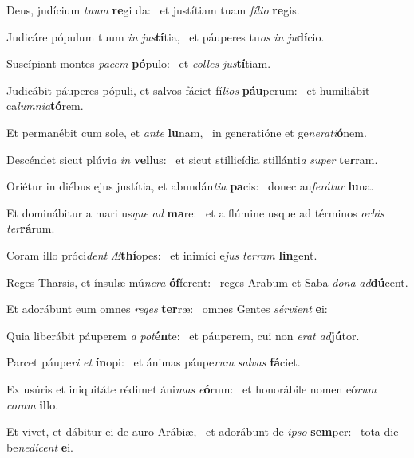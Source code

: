 \item Deus, judícium \textit{tuum} \textbf{re}gi da:~\psstar{} et justítiam tuam \textit{fílio} \textbf{re}gis.
\item Judicáre pópulum tuum \textit{in} \textit{jus}\textbf{tí}tia,~\psstar{} et páuperes tu\textit{os} \textit{in} \textit{ju}\textbf{dí}cio.
\item Suscípiant montes \textit{pacem} \textbf{pó}pulo:~\psstar{} et \textit{colles} \textit{jus}\textbf{tí}tiam.
\item Judicábit páuperes pópuli, et salvos fáciet fí\textit{lios} \textbf{páu}perum:~\psstar{} et humiliábit ca\textit{lumnia}\textbf{tó}rem.
\item Et permanébit cum sole, et \textit{ante} \textbf{lu}nam,~\psstar{} in generatióne et ge\textit{nerati}\textbf{ó}nem.
\item Descéndet sicut plúvi\textit{a} \textit{in} \textbf{vel}lus:~\psstar{} et sicut stillicídia stillánti\textit{a} \textit{super} \textbf{ter}ram.
\item Oriétur in diébus ejus justítia, et abundán\textit{tia} \textbf{pa}cis:~\psstar{} donec au\textit{ferátur} \textbf{lu}na.
\item Et dominábitur a mari us\textit{que} \textit{ad} \textbf{ma}re:~\psstar{} et a flúmine usque ad términos \textit{orbis} \textit{ter}\textbf{rá}rum.
\item Coram illo próci\textit{dent} \textit{Æ}\textbf{thí}opes:~\psstar{} et inimíci e\textit{jus} \textit{terram} \textbf{lin}gent.
\item Reges Tharsis, et ínsulæ mú\textit{nera} \textbf{óf}ferent:~\psstar{} reges Arabum et Saba \textit{dona} \textit{ad}\textbf{dú}cent.
\item Et adorábunt eum omnes \textit{reges} \textbf{ter}ræ:~\psstar{} omnes Gentes \textit{sérvient} \textbf{e}i:
\item Quia liberábit páuperem \textit{a} \textit{pot}\textbf{én}te:~\psstar{} et páuperem, cui non \textit{erat} \textit{ad}\textbf{jú}tor.
\item Parcet páupe\textit{ri} \textit{et} \textbf{ín}opi:~\psstar{} et ánimas páupe\textit{rum} \textit{salvas} \textbf{fá}ciet.
\item Ex usúris et iniquitáte rédimet áni\textit{mas} \textit{e}\textbf{ó}rum:~\psstar{} et honorábile nomen eó\textit{rum} \textit{coram} \textbf{il}lo.
\item Et vivet, et dábitur ei de auro Arábiæ,~\pscross{} et adorábunt de \textit{ipso} \textbf{sem}per:~\psstar{} tota die be\textit{nedícent} \textbf{e}i.
